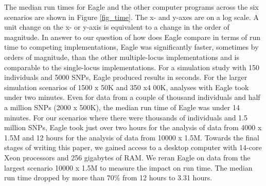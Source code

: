 \documentclass{article}
\begin{document}
The median run times for Eagle and the other computer programs across the six scenarios are shown in Figure \ref{fig_time}. 
The x- and y-axes are on a log scale.  A unit change on the x- or y-axis is equivalent to a change in the order of magnitude.  
In answer to our question of how does Eagle compare in terms of run time to competing implementations, 
Eagle was significantly faster, sometimes by orders of magnitude,  than the other multiple-locus
 implementations and is comparable to the single-locus implementations. For a simulation study with 150 individuals and 
 5000 SNPs, Eagle produced results in seconds.  For the larger simulation scenarios of 1500 x  50K and 350 x4 00K, 
 analyses with Eagle took under two minutes. Even for data from a couple of thousand individuals and half a million 
 SNPs (2000 x 500K), the median run time of Eagle was under 14 minutes. For our scenarios where there 
 were thousands of individuals and 1.5 million SNPs, Eagle took just over two hours for the analysis of data from 
 4000 x 1.5M and  12 hours for the analysis of data from 10000 x 1.5M. 
 Towards the final stages of writing this paper, 
 we gained access to a desktop computer with 14-core Xeon processors and 256 gigabytes of RAM. We reran Eagle on data from the largest
  scenario 10000 x 1.5M to measure the impact on run time. The median run time dropped by more than 70\% 
  from 12 hours to 3.31 hours. 
 
  
\end{document}
